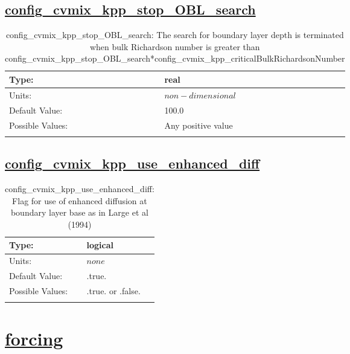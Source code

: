 \subsection[config\_cvmix\_kpp\_stop\_OBL\_search]{\hyperref[sec:nm_tab_cvmix]{config\_cvmix\_kpp\_stop\_OBL\_search}}
\label{subsec:nm_sec_config_cvmix_kpp_stop_OBL_search}
\begin{center}
\begin{longtable}{| p{2.0in} || p{4.0in} |}
    \hline
    Type: & real \\
    \hline
    Units: & $non-dimensional$ \\
    \hline
    Default Value: & 100.0 \\
    \hline
    Possible Values: & Any positive value \\
    \hline
    \caption{config\_cvmix\_kpp\_stop\_OBL\_search: The search for boundary layer depth is terminated when bulk Richardson number is greater than config\_cvmix\_kpp\_stop\_OBL\_search*config\_cvmix\_kpp\_criticalBulkRichardsonNumber}
\end{longtable}
\end{center}
\subsection[config\_cvmix\_kpp\_use\_enhanced\_diff]{\hyperref[sec:nm_tab_cvmix]{config\_cvmix\_kpp\_use\_enhanced\_diff}}
\label{subsec:nm_sec_config_cvmix_kpp_use_enhanced_diff}
\begin{center}
\begin{longtable}{| p{2.0in} || p{4.0in} |}
    \hline
    Type: & logical \\
    \hline
    Units: & $none$ \\
    \hline
    Default Value: & .true. \\
    \hline
    Possible Values: & .true. or .false. \\
    \hline
    \caption{config\_cvmix\_kpp\_use\_enhanced\_diff: Flag for use of enhanced diffusion at boundary layer base as in Large et al (1994)}
\end{longtable}
\end{center}
\section[forcing]{\hyperref[sec:nm_tab_forcing]{forcing}}
\label{sec:nm_sec_forcing}
